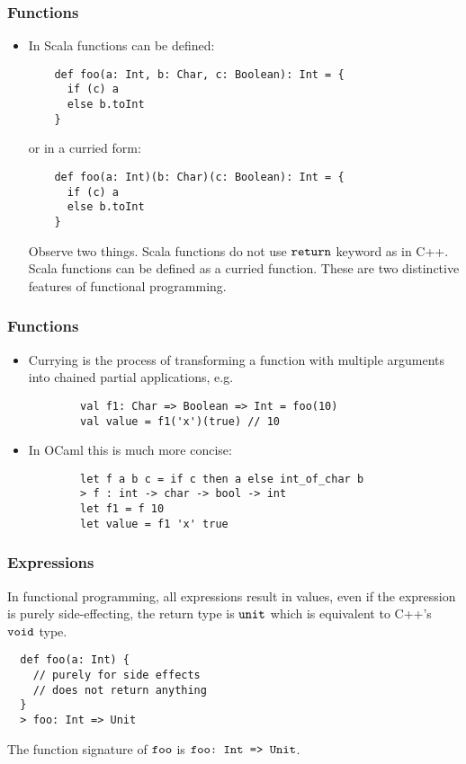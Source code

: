 \documentclass[handout]{beamer}
\begin{document}
\begin{frame}[fragile]
  \frametitle{Functions}
  \begin{itemize}
  \item In Scala functions can be defined:
    \begin{verbatim}
    def foo(a: Int, b: Char, c: Boolean): Int = {
      if (c) a
      else b.toInt
    }
    \end{verbatim}
    or in a curried form:
    \begin{verbatim}
    def foo(a: Int)(b: Char)(c: Boolean): Int = {
      if (c) a
      else b.toInt
    }
    \end{verbatim}
    Observe two things. Scala functions do not use $\verb|return|$ keyword as in C++. Scala functions can be defined as a curried function. These are two distinctive features of functional programming.
  \end{itemize}
\end{frame}

\begin{frame}[fragile]
  \frametitle{Functions}
  \begin{itemize}
      \item Currying is the process of transforming a function with multiple arguments into chained partial applications, e.g.
      \begin{verbatim}
        val f1: Char => Boolean => Int = foo(10)
        val value = f1('x')(true) // 10
      \end{verbatim}
      \item In OCaml this is much more concise:
        \begin{verbatim}
        let f a b c = if c then a else int_of_char b
        > f : int -> char -> bool -> int
        let f1 = f 10
        let value = f1 'x' true
        \end{verbatim}
  \end{itemize}
\end{frame}

\begin{frame}[fragile]
  \frametitle{Expressions}
  In functional programming, all expressions result in values, even if the expression is purely side-effecting, the return type is $\verb|unit|$ which is equivalent to C++'s $\verb|void|$ type.
  \begin{verbatim}
  def foo(a: Int) {
    // purely for side effects
    // does not return anything
  }
  > foo: Int => Unit
  \end{verbatim}
  The function signature of $\verb|foo|$ is $\verb|foo: Int => Unit|$.
\end{frame}
\end{document}

